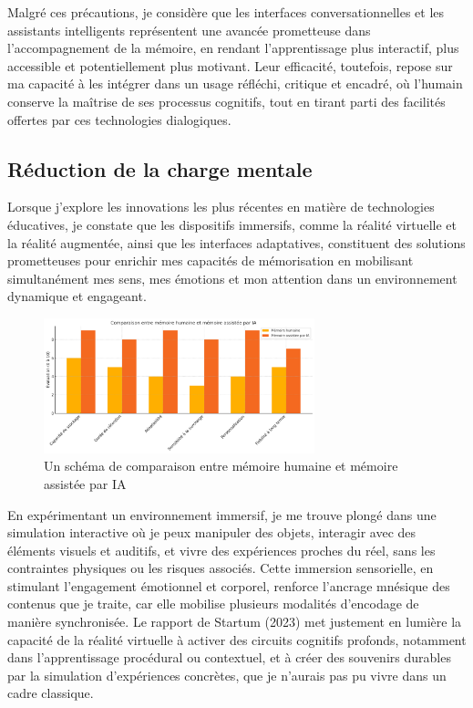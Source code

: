 \documentclass[11pt,a4paper]{report}
\begin{document}
Malgré ces précautions, je considère que les interfaces conversationnelles et les assistants intelligents représentent une avancée prometteuse dans l’accompagnement de la mémoire, en rendant l’apprentissage plus interactif, plus accessible et potentiellement plus motivant. Leur efficacité, toutefois, repose sur ma capacité à les intégrer dans un usage réfléchi, critique et encadré, où l’humain conserve la maîtrise de ses processus cognitifs, tout en tirant parti des facilités offertes par ces technologies dialogiques.

\subsection{Réduction de la charge mentale}

Lorsque j’explore les innovations les plus récentes en matière de technologies éducatives, je constate que les dispositifs immersifs, comme la réalité virtuelle et la réalité augmentée, ainsi que les interfaces adaptatives, constituent des solutions prometteuses pour enrichir mes capacités de mémorisation en mobilisant simultanément mes sens, mes émotions et mon attention dans un environnement dynamique et engageant.

\begin{figure}[h]
    \centering
    \includegraphics[width=0.7\textwidth]{images/2.png}
    \caption{Un schéma de comparaison entre mémoire humaine et mémoire assistée par IA}
    \label{fig:2.2.3}
\end{figure}


En expérimentant un environnement immersif, je me trouve plongé dans une simulation interactive où je peux manipuler des objets, interagir avec des éléments visuels et auditifs, et vivre des expériences proches du réel, sans les contraintes physiques ou les risques associés. Cette immersion sensorielle, en stimulant l’engagement émotionnel et corporel, renforce l’ancrage mnésique des contenus que je traite, car elle mobilise plusieurs modalités d’encodage de manière synchronisée. Le rapport de Startum (2023) met justement en lumière la capacité de la réalité virtuelle à activer des circuits cognitifs profonds, notamment dans l’apprentissage procédural ou contextuel, et à créer des souvenirs durables par la simulation d’expériences concrètes, que je n’aurais pas pu vivre dans un cadre classique.
\end{document}

